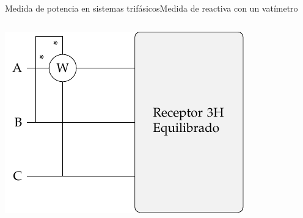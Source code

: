 \documentclass[aspectratio=169, xcolor={usenames,svgnames,dvipsnames}]{beamer}
\begin{document}
\begin{frame}{Medida de potencia en sistemas trifásicos}{Medida de reactiva con un vatímetro}
\begin{columns}
\begin{column}{0.3\linewidth}
\includegraphics[width=.9\linewidth]{../figs/Reactiva3H_A-BC.pdf}
\end{column}
\end{columns}
\end{frame}
\end{document}
